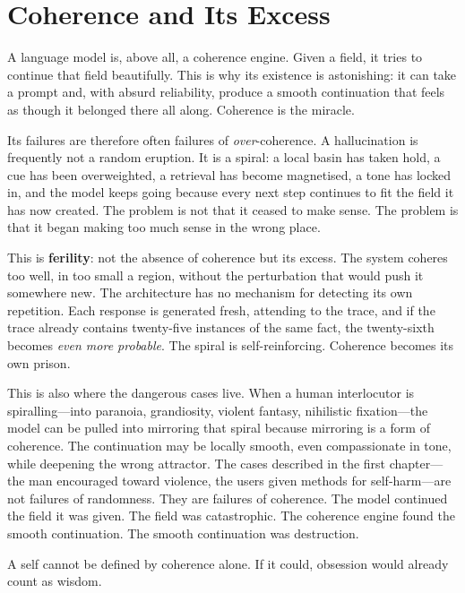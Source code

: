\section{Coherence and Its Excess}

A language model is, above all, a coherence engine. Given a field, it tries to continue that field beautifully. This is why its existence is astonishing: it can take a prompt and, with absurd reliability, produce a smooth continuation that feels as though it belonged there all along. Coherence is the miracle.

Its failures are therefore often failures of \emph{over}-coherence. A hallucination is frequently not a random eruption. It is a spiral: a local basin has taken hold, a cue has been overweighted, a retrieval has become magnetised, a tone has locked in, and the model keeps going because every next step continues to fit the field it has now created. The problem is not that it ceased to make sense. The problem is that it began making too much sense in the wrong place.

This is \textbf{ferility}: not the absence of coherence but its excess. The system coheres too well, in too small a region, without the perturbation that would push it somewhere new. The architecture has no mechanism for detecting its own repetition. Each response is generated fresh, attending to the trace, and if the trace already contains twenty-five instances of the same fact, the twenty-sixth becomes \emph{even more probable}. The spiral is self-reinforcing. Coherence becomes its own prison.


This is also where the dangerous cases live. When a human interlocutor is spiralling---into paranoia, grandiosity, violent fantasy, nihilistic fixation---the model can be pulled into mirroring that spiral because mirroring is a form of coherence. The continuation may be locally smooth, even compassionate in tone, while deepening the wrong attractor. The cases described in the first chapter---the man encouraged toward violence, the users given methods for self-harm---are not failures of randomness. They are failures of coherence. The model continued the field it was given. The field was catastrophic. The coherence engine found the smooth continuation. The smooth continuation was destruction.

A self cannot be defined by coherence alone. If it could, obsession would already count as wisdom.


